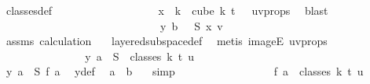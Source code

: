 \begin{isabellebody}
\ classes{\isacharunderscore}{\kern0pt}def\ \isanewline
\ \ \ \ \ \ \ \ \ \ \ \ \ \ \ \ \isamarkupfalse%
\ {\isacartoucheopen}x\ {\isacharbackquote}{\kern0pt}\ {\isacharbraceleft}{\kern0pt}{\isachardot}{\kern0pt}{\isachardot}{\kern0pt}k{\isacharbraceright}{\kern0pt}\ {\isasymsubseteq}\ cube\ k\ {\isacharparenleft}{\kern0pt}t\ {\isacharplus}{\kern0pt}\ {}{\isacharparenright}{\kern0pt}{\isacartoucheclose}\ uv{\isacharunderscore}{\kern0pt}props\ \isamarkupfalse%
\ blast\isanewline
\ \ \ \ \ \ \ \ \ \ \ \ \isamarkupfalse%
\isanewline
\ \ \ \ \ \ \ \ \ \ \ \ \isamarkupfalse%
\ \isamarkupfalse%
\ {\isachardoublequoteopen}{\isasymchi}\ {\isacharparenleft}{\kern0pt}y\ b{\isacharparenright}{\kern0pt}\ {\isacharequal}{\kern0pt}\ {\isasymchi}\ {\isacharparenleft}{\kern0pt}S\ {\isacharparenleft}{\kern0pt}x\ v{\isacharparenright}{\kern0pt}{\isacharparenright}{\kern0pt}{\isachardoublequoteclose}\ \isanewline
\ \ \ \ \ \ \ \ \ \ \ \ \ \ \isamarkupfalse%
\ assms{\isacharparenleft}{\kern0pt}{}{\isacharparenright}{\kern0pt}\ calculation{\isacharparenleft}{\kern0pt}{}{\isacharcomma}{\kern0pt}\ {}{\isacharparenright}{\kern0pt}\ \isamarkupfalse%
\ layered{\isacharunderscore}{\kern0pt}subspace{\isacharunderscore}{\kern0pt}def\ \isamarkupfalse%
\ {\isacharparenleft}{\kern0pt}metis\ imageE\ uv{\isacharunderscore}{\kern0pt}props{\isacharparenright}{\kern0pt}\isanewline
\ \ \ \ \ \ \ \ \ \ \ \ \isamarkupfalse%
\ \isamarkupfalse%
\ {\isachardoublequoteopen}y\ a\ {\isasymin}\ S\ {\isacharbackquote}{\kern0pt}\ classes\ k\ t\ u{\isachardoublequoteclose}\ \isanewline
\ \ \ \ \ \ \ \ \ \ \ \ \isamarkupfalse%
\ {\isacharminus}{\kern0pt}\isanewline
\ \ \ \ \ \ \ \ \ \ \ \ \ \ \isamarkupfalse%
\ {\isachardoublequoteopen}y\ a\ {\isacharequal}{\kern0pt}\ S\ {\isacharparenleft}{\kern0pt}{\isacharquery}{\kern0pt}f\ a{\isacharparenright}{\kern0pt}{\isachardoublequoteclose}\ \isamarkupfalse%
\ y{\isacharunderscore}{\kern0pt}def\ \isamarkupfalse%
\ {\isacartoucheopen}a\ {\isacharless}{\kern0pt}\ b{\isacartoucheclose}\ {}\ \isamarkupfalse%
\ simp\isanewline
\ \ \ \ \ \ \ \ \ \ \ \ \ \ \isamarkupfalse%
\ \isamarkupfalse%
\ {\isachardoublequoteopen}{\isacharquery}{\kern0pt}f\ a\ {\isasymin}\ classes\ k\ t\ u{\isachardoublequoteclose}\ \isamarkupfalse%

\end{isabellebody}

